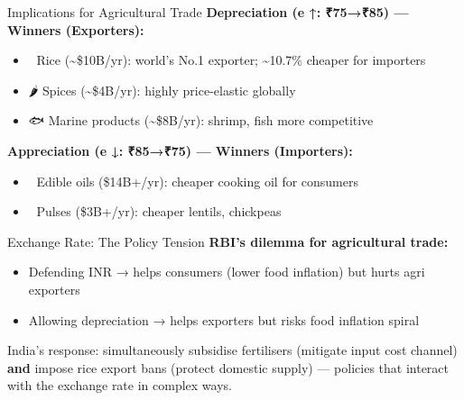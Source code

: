 \documentclass[
  ignorenonframetext,
  aspectratio=169,
]{beamer}
\makeatletter
\providecommand{\tightlist}{%
  \setlength{\itemsep}{0pt}\setlength{\parskip}{0pt}}
\let\quarto@originallabel\label
\DeclareRobustCommand*{\label}[1]{\quarto@originallabel{#1}}
\makeatother
\begin{document}
\begin{frame}{Implications for Agricultural Trade}
\label{implications-for-agricultural-trade}
\textbf{Depreciation (e ↑: ₹75→₹85) --- Winners (Exporters):}

\begin{itemize}
\tightlist
\item
  🌾 Rice (\textasciitilde\$10B/yr): world's No.1 exporter;
  \textasciitilde10.7\% cheaper for importers
\item
  🌶️ Spices (\textasciitilde\$4B/yr): highly price-elastic globally
\item
  🐟 Marine products (\textasciitilde\$8B/yr): shrimp, fish more
  competitive
\end{itemize}

\textbf{Appreciation (e ↓: ₹85→₹75) --- Winners (Importers):}

\begin{itemize}
\tightlist
\item
  🫙 Edible oils (\$14B+/yr): cheaper cooking oil for consumers
\item
  🌱 Pulses (\$3B+/yr): cheaper lentils, chickpeas
\end{itemize}

\end{frame}

\begin{frame}{Exchange Rate: The Policy Tension}
\label{exchange-rate-the-policy-tension}
\textbf{RBI's dilemma for agricultural trade:}

\begin{itemize}
\tightlist
\item
  Defending INR → helps consumers (lower food inflation) but hurts agri
  exporters
\item
  Allowing depreciation → helps exporters but risks food inflation
  spiral
\end{itemize}

India's response: simultaneously subsidise fertilisers (mitigate input
cost channel) \textbf{and} impose rice export bans (protect domestic
supply) --- policies that interact with the exchange rate in complex
ways.
\end{frame}
\end{document}
